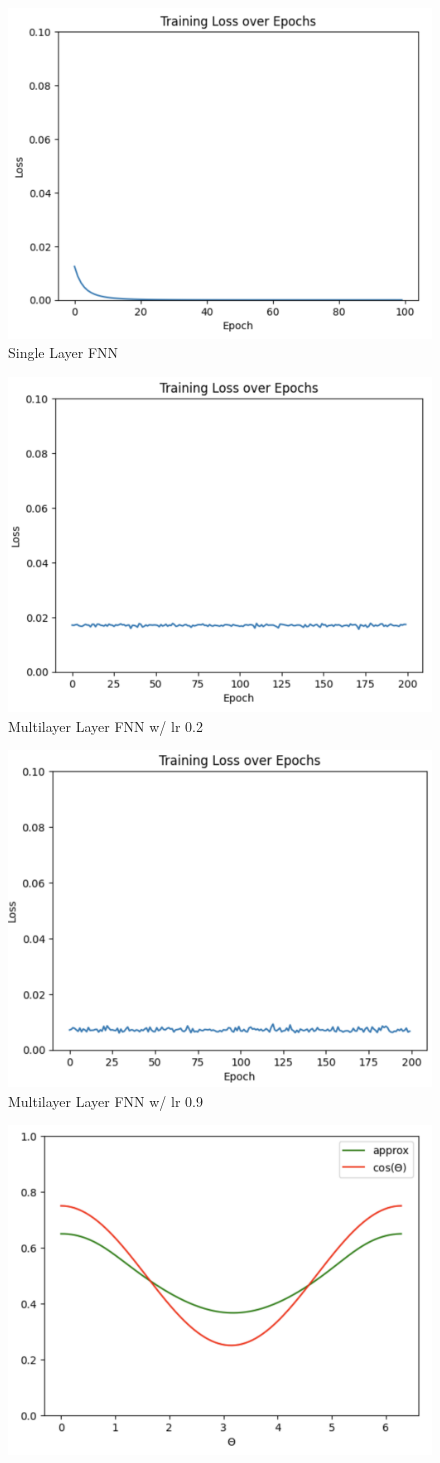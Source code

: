 \documentclass[12pt, a4paper]{article}
\begin{document}
\begin{itemize}
    \begin{figure}
        \centering
        \includegraphics[width=0.5\linewidth]{Screenshot 2024-04-12 at 12.24.09 PM.png}
        \caption{Single Layer FNN}
        \label{fig:enter-label}
    \end{figure}
    \begin{figure}
        \centering
        \includegraphics[width=0.5\linewidth]{Screenshot 2024-04-12 at 12.23.47 AM.png}
        \caption{Multilayer Layer FNN w/ lr 0.2}
        \label{fig:enter-label}
    \end{figure}
    \begin{figure}
        \centering
        \includegraphics[width=0.5\linewidth]{Screenshot 2024-04-12 at 12.23.05 AM.png}
        \caption{Multilayer Layer FNN w/ lr 0.9}
        \label{fig:enter-label}
    \end{figure}
    \begin{figure}
        \centering
        \includegraphics[width=0.5\linewidth]{20, 10 parameters.png}

\end{figure}
\end{itemize}
\end{document}
